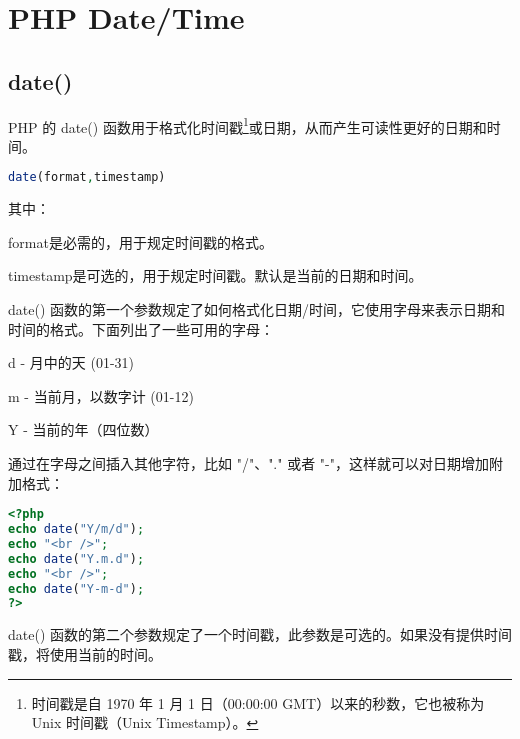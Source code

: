 \begin{lstlisting}[language=PHP]

\end{lstlisting}



\chapter{PHP Date/Time}


\section{date()}



PHP 的 date() 函数用于格式化时间戳\footnote{时间戳是自 1970 年 1 月 1 日（00:00:00 GMT）以来的秒数，它也被称为 Unix 时间戳（Unix Timestamp）。}或日期，从而产生可读性更好的日期和时间。

\begin{lstlisting}[language=PHP]
     date(format,timestamp)
\end{lstlisting}

其中：

\begin{compactitem}
\item format是必需的，用于规定时间戳的格式。
\item timestamp是可选的，用于规定时间戳。默认是当前的日期和时间。
\end{compactitem}


date() 函数的第一个参数规定了如何格式化日期/时间，它使用字母来表示日期和时间的格式。下面列出了一些可用的字母：

\begin{compactitem}
\item d - 月中的天 (01-31)
\item m - 当前月，以数字计 (01-12)
\item Y - 当前的年（四位数）
\end{compactitem}

通过在字母之间插入其他字符，比如 "/"、"." 或者 "-"，这样就可以对日期增加附加格式：


\begin{lstlisting}[language=PHP]
<?php
echo date("Y/m/d");
echo "<br />";
echo date("Y.m.d");
echo "<br />";
echo date("Y-m-d");
?>
\end{lstlisting}

date() 函数的第二个参数规定了一个时间戳，此参数是可选的。如果没有提供时间戳，将使用当前的时间。

